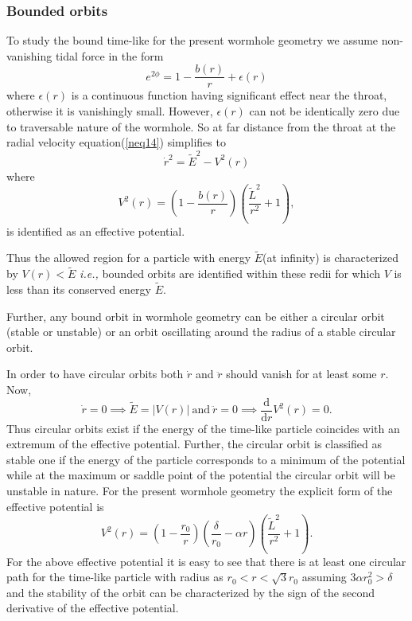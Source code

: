 \documentclass[10pt]{revtex4}
\begin{document}
\subsubsection{Bounded orbits}
To study the bound time-like for the present wormhole geometry we assume non-vanishing tidal force in the form
\begin{equation}
e^{2\phi}=1-\frac{b(r)}{r}+\epsilon(r)
\end{equation} 
where $\epsilon(r)$ is a continuous function having significant effect near the throat, otherwise it is vanishingly small. However, $\epsilon(r)$ can not be identically zero due to traversable nature of the wormhole. So at far distance from the throat at the radial velocity equation(\ref{neq14}) simplifies to 
\begin{equation}
\dot{r}^2=\tilde{E}^2-V^2(r)
\end{equation} 
where 
\begin{equation}
V^2(r)=\left(1-\frac{b(r)}{r}\right)\left(\frac{\tilde{L}^2}{r^2}+1\right),
\end{equation}
is identified as an effective potential.
\par 
Thus the allowed region for a particle with energy $\tilde{E}$(at infinity) is characterized by $V(r)<\tilde{E}$ {\it i.e.,} bounded orbits are identified within these redii for which $V$ is less than its conserved energy $\tilde{E}$.
\par 
Further, any bound orbit in wormhole geometry can be either a circular orbit (stable or unstable) or an orbit oscillating around the radius of a stable circular orbit.
\par 
In order to have circular orbits both $\dot{r}$ and $\ddot{r}$ should vanish for at least some $r$. Now, 
\begin{equation}
\dot{r}=0\implies\tilde{E}=|{V(r)}|~{\text{and}}~\ddot{r}=0\implies\frac{\mathrm{d}}{\mathrm{d}r}V^2(r)=0.
\end{equation}
Thus circular orbits exist if the energy of the time-like particle coincides with an extremum of the effective potential. Further, the circular orbit is classified as stable one if the energy of the particle corresponds to a minimum of the potential while at the maximum or saddle point of the potential the circular orbit will be unstable in nature. For the present wormhole geometry the explicit form of the effective potential is 
\begin{equation}
V^2(r)=\left(1-\frac{r_0}{r}\right)\left(\frac{\delta}{r_0}-\alpha r\right)\left(\frac{\tilde{L}^2}{r^2}+1\right).
\end{equation}
For the above effective potential it is easy to see that there is at least one circular path for the time-like particle with radius as $r_0<r<\sqrt{3}r_0$ assuming $3\alpha r_0^2>\delta$ and the stability of the orbit can be characterized by the sign of the second derivative of the effective potential.
\end{document}
